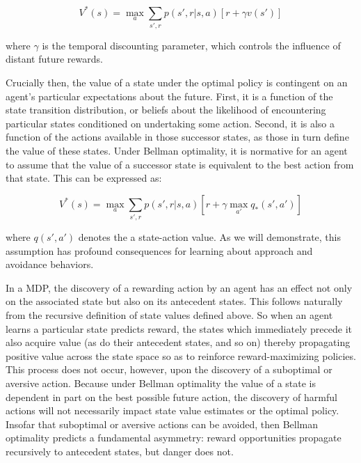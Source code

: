 \documentclass[11pt]{article} %
\begin{document}
$$ V^*(s) = \max_a \sum_{s',r} p(s',r|s,a) \left[ r + \gamma v(s') \right] $$

where $\gamma$ is the temporal discounting parameter, which controls the influence of distant future rewards.

Crucially then, the value of a state under the optimal policy is contingent on an agent's particular expectations about the future. First, it is a function of the state transition distribution, or beliefs about the likelihood of encountering particular states conditioned on undertaking some action. Second, it is also a function of the actions available in those successor states, as those in turn define the value of these states. Under Bellman optimality, it is normative for an agent to assume that the value of a successor state is equivalent to the best action from that state. This can be expressed as:

$$ V^*(s) = \max_a \sum_{s',r}p(s',r|s,a) \left[ r + \gamma \max_{a'} q_*(s',a') \right] $$

where $q(s',a')$ denotes the a state-action value. As we will demonstrate, this assumption has profound consequences for learning about approach and avoidance behaviors.

In a MDP, the discovery of a rewarding action by an agent has an effect not only on the associated state but also on its antecedent states. This follows naturally from the recursive definition of state values defined above. So when an agent learns a particular state predicts reward, the states which immediately precede it also acquire value (as do their antecedent states, and so on) thereby propagating positive value across the state space so as to reinforce reward-maximizing policies. This process does not occur, however, upon the discovery of a suboptimal or aversive action. Because under Bellman optimality the value of a state is dependent in part on the best possible future action, the discovery of harmful actions will not necessarily impact state value estimates or the optimal policy. Insofar that suboptimal or aversive actions can be avoided, then Bellman optimality predicts a fundamental asymmetry: reward opportunities propagate recursively to antecedent states, but danger does not.
\end{document}

